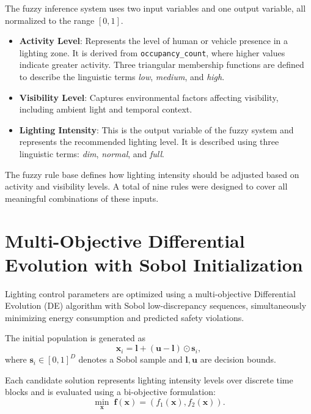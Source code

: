 \documentclass[conference]{IEEEtran}
\begin{document}
The fuzzy inference system uses two input variables and one output variable, all normalized to the range $[0,1]$.

\begin{itemize}
    \item \textbf{Activity Level}: Represents the level of human or vehicle presence in a lighting zone. It is derived from \texttt{occupancy\_count}, where higher values indicate greater activity. Three triangular membership functions are defined to describe the linguistic terms \emph{low}, \emph{medium}, and \emph{high}.
    
    \item \textbf{Visibility Level}: Captures environmental factors affecting visibility, including ambient light and temporal context.

    \item \textbf{Lighting Intensity}: This is the output variable of the fuzzy system and represents the recommended lighting level. It is described using three linguistic terms: \emph{dim}, \emph{normal}, and \emph{full}.
\end{itemize}

The fuzzy rule base defines how lighting intensity should be adjusted based on activity and visibility levels. A total of nine rules were designed to cover all meaningful combinations of these inputs.

\section{Multi-Objective Differential Evolution with Sobol Initialization}

Lighting control parameters are optimized using a multi-objective Differential Evolution (DE) algorithm with Sobol low-discrepancy sequences, simultaneously minimizing energy consumption and predicted safety violations.

The initial population is generated as
\begin{equation}
\mathbf{x}_i = \mathbf{l} + (\mathbf{u} - \mathbf{l}) \odot \mathbf{s}_i,
\end{equation}
where $\mathbf{s}_i \in [0,1]^D$ denotes a Sobol sample and $\mathbf{l}, \mathbf{u}$ are decision bounds.

Each candidate solution represents lighting intensity levels over discrete time blocks and is evaluated using a bi-objective formulation:
\begin{equation}
\min_{\mathbf{x}} \; \mathbf{f}(\mathbf{x}) = \left( f_1(\mathbf{x}), f_2(\mathbf{x}) \right).
\end{equation}
\end{document}
